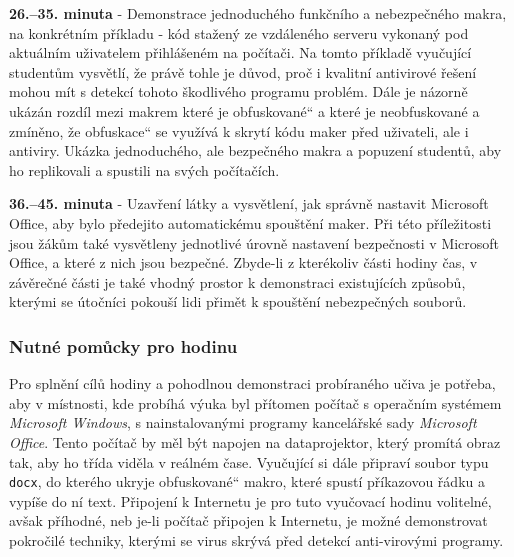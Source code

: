 \documentclass[a4paper, 12pt]{article}
\providecommand{\uv}[1]{\quotedblbase #1\textquotedblleft}
\begin{document}
\textbf{26.--35. minuta} - Demonstrace jednoduchého funkčního a nebezpečného makra, na konkrétním příkladu - kód stažený ze vzdáleného serveru vykonaný pod aktuálním uživatelem přihlášeném na počítači. Na tomto příkladě vyučující studentům vysvětlí, že právě tohle je důvod, proč i kvalitní antivirové řešení mohou mít s detekcí tohoto škodlivého programu problém. Dále je názorně ukázán rozdíl mezi makrem které je \uv{obfuskované} a které je neobfuskované a zmíněno, že \uv{obfuskace} se využívá k skrytí kódu maker před uživateli, ale i antiviry. Ukázka jednoduchého, ale bezpečného makra a popuzení studentů, aby ho replikovali a spustili na svých počítačích.

\textbf{36.--45. minuta} - Uzavření látky a vysvětlení, jak správně nastavit Microsoft Office, aby bylo předejito automatickému spouštění maker. Při této příležitosti jsou žákům také vysvětleny jednotlivé úrovně nastavení bezpečnosti v Microsoft Office, a které z nich jsou bezpečné. Zbyde-li z kterékoliv části hodiny čas, v závěrečné části je také vhodný prostor k demonstraci existujících způsobů, kterými se útočníci pokouší lidi přimět k spouštění nebezpečných souborů. 

\subsubsection{Nutné pomůcky pro hodinu}
Pro splnění cílů hodiny a pohodlnou demonstraci probíraného učiva je potřeba, aby v místnosti, kde probíhá výuka byl přítomen počítač s operačním systémem \textit{Microsoft Windows}, s nainstalovanými programy kancelářské sady \textit{Microsoft Office}. Tento počítač by měl být napojen na dataprojektor, který promítá obraz tak, aby ho třída viděla v reálném čase. Vyučující si dále připraví soubor typu \texttt{docx}, do kterého ukryje \uv{obfuskované} makro, které spustí příkazovou řádku a vypíše do ní text. Připojení k Internetu je pro tuto vyučovací hodinu volitelné, avšak příhodné, neb je-li počítač připojen k Internetu, je možné demonstrovat pokročilé techniky, kterými se virus skrývá před detekcí anti-virovými programy.

\newpage
\end{document}
